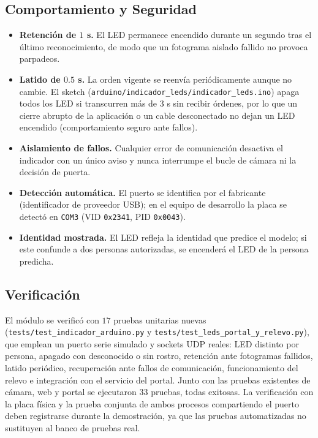 \documentclass{article}
\begin{document}
\subsection{Comportamiento y Seguridad}
\begin{itemize}
    \item \textbf{Retención de $1$ s.} El LED permanece encendido durante un segundo tras el último reconocimiento, de modo que un fotograma aislado fallido no provoca parpadeos.
    \item \textbf{Latido de $0.5$ s.} La orden vigente se reenvía periódicamente aunque no cambie. El sketch (\texttt{arduino/indicador\_leds/indicador\_leds.ino}) apaga todos los LED si transcurren más de $3$ s sin recibir órdenes, por lo que un cierre abrupto de la aplicación o un cable desconectado no dejan un LED encendido (comportamiento seguro ante fallos).
    \item \textbf{Aislamiento de fallos.} Cualquier error de comunicación desactiva el indicador con un único aviso y nunca interrumpe el bucle de cámara ni la decisión de puerta.
    \item \textbf{Detección automática.} El puerto se identifica por el fabricante (identificador de proveedor USB); en el equipo de desarrollo la placa se detectó en \texttt{COM3} (VID \texttt{0x2341}, PID \texttt{0x0043}).
    \item \textbf{Identidad mostrada.} El LED refleja la identidad que predice el modelo; si este confunde a dos personas autorizadas, se encenderá el LED de la persona predicha.
\end{itemize}

\subsection{Verificación}
El módulo se verificó con $17$ pruebas unitarias nuevas (\texttt{tests/test\_indicador\_arduino.py} y \texttt{tests/test\_leds\_portal\_y\_relevo.py}), que emplean un puerto serie simulado y sockets UDP reales: LED distinto por persona, apagado con desconocido o sin rostro, retención ante fotogramas fallidos, latido periódico, recuperación ante fallos de comunicación, funcionamiento del relevo e integración con el servicio del portal. Junto con las pruebas existentes de cámara, web y portal se ejecutaron $33$ pruebas, todas exitosas. La verificación con la placa física y la prueba conjunta de ambos procesos compartiendo el puerto deben registrarse durante la demostración, ya que las pruebas automatizadas no sustituyen al banco de pruebas real.
\end{document}
